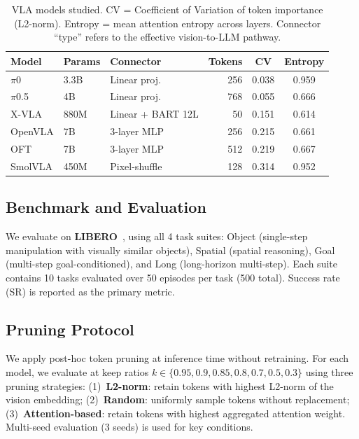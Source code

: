 \documentclass[10pt,twocolumn]{article}
\begin{document}
\begin{table}[t]
\centering
\caption{VLA models studied. CV = Coefficient of Variation of token importance (L2-norm). Entropy = mean attention entropy across layers. Connector ``type'' refers to the effective vision-to-LLM pathway.}
\label{tab:models}
\small
\begin{tabular}{@{}lllrcc@{}}
\toprule
Model & Params & Connector & Tokens & CV & Entropy \\
\midrule
$\pi$0 & 3.3B & Linear proj. & 256 & 0.038 & 0.959 \\
$\pi$0.5 & 4B & Linear proj. & 768 & 0.055 & 0.666 \\
X-VLA & 880M & Linear + BART 12L & 50 & 0.151 & 0.614 \\
OpenVLA & 7B & 3-layer MLP & 256 & 0.215 & 0.661 \\
OFT & 7B & 3-layer MLP & 512 & 0.219 & 0.667 \\
SmolVLA & 450M & Pixel-shuffle & 128 & 0.314 & 0.952 \\
\bottomrule
\end{tabular}
\end{table}

\subsection{Benchmark and Evaluation}

We evaluate on \textbf{LIBERO}~\cite{liu2023libero}, using all 4 task suites: Object (single-step manipulation with visually similar objects), Spatial (spatial reasoning), Goal (multi-step goal-conditioned), and Long (long-horizon multi-step).
Each suite contains 10 tasks evaluated over 50 episodes per task (500 total).
Success rate (SR) is reported as the primary metric.

\subsection{Pruning Protocol}

We apply post-hoc token pruning at inference time without retraining.
For each model, we evaluate at keep ratios $k \in \{0.95, 0.9, 0.85, 0.8, 0.7, 0.5, 0.3\}$ using three pruning strategies:
(1)~\textbf{L2-norm}: retain tokens with highest L2-norm of the vision embedding;
(2)~\textbf{Random}: uniformly sample tokens without replacement;
(3)~\textbf{Attention-based}: retain tokens with highest aggregated attention weight.
Multi-seed evaluation (3 seeds) is used for key conditions.
\end{document}
